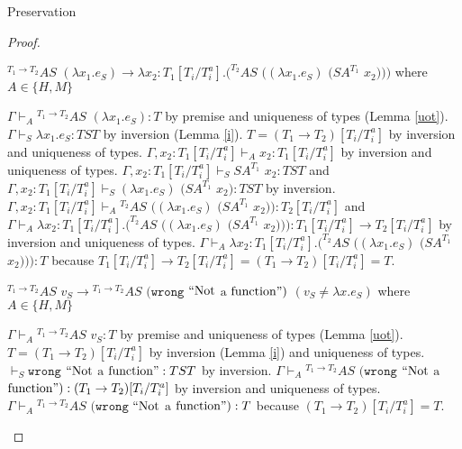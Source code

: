 \begin{theorem}{Preservation}
\begin{proof}

\begin{case}
$^{T_{1}\rightarrow T_{2}}AS$ $(\lambda x_{1}.e_{S})\rightarrow\lambda x_{2}:T_{1}[T_{i}/T_{i}^{a}].(^{T_{2}}AS$ $((\lambda x_{1}.e_{S})$ $(SA^{T_{1}}$ $x_{2})))$ where $A\in\lbrace H,M\rbrace$

$\Gamma\vdash_{A}{^{T_{1}\rightarrow T_{2}}A}S$ $(\lambda x_{1}.e_{S}):T$ by premise and uniqueness of types (Lemma \ref{uot}).  $\Gamma\vdash_{S}\lambda x_{1}.e_{S}:TST$ by inversion (Lemma \ref{i}).  $T=(T_{1}\rightarrow T_{2})[T_{i}/T_{i}^{a}]$ by inversion and uniqueness of types.  $\Gamma,x_{2}:T_{1}[T_{i}/T_{i}^{a}]\vdash_{A}x_{2}:T_{1}[T_{i}/T_{i}^{a}]$ by inversion and uniqueness of types.  $\Gamma,x_{2}:T_{1}[T_{i}/T_{i}^{a}]\vdash_{S}SA^{T_{1}}$ $x_{2}:TST$ and $\Gamma,x_{2}:T_{1}[T_{i}/T_{i}^{a}]\vdash_{S}(\lambda x_{1}.e_{S})$ $(SA^{T_{1}}$ $x_{2}):TST$ by inversion.  $\Gamma,x_{2}:T_{1}[T_{i}/T_{i}^{a}]\vdash_{A}{^{T_{2}}A}S$ $((\lambda x_{1}.e_{S})$ $(SA^{T_{1}}$ $x_{2})):T_{2}[T_{i}/T_{i}^{a}]$ and $\Gamma\vdash_{A}\lambda x_{2}:T_{1}[T_{i}/T_{i}^{a}].(^{T_{2}}AS$ $((\lambda x_{1}.e_{S})$ $(SA^{T_{1}}$ $x_{2}))):T_{1}[T_{i}/T_{i}^{a}]\rightarrow T_{2}[T_{i}/T_{i}^{a}]$ by inversion and uniqueness of types.  $\Gamma\vdash_{A}\lambda x_{2}:T_{1}[T_{i}/T_{i}^{a}].(^{T_{2}}AS$ $((\lambda x_{1}.e_{S})$ $(SA^{T_{1}}$ $x_{2}))):T$ because $T_{1}[T_{i}/T_{i}^{a}]\rightarrow T_{2}[T_{i}/T_{i}^{a}]=(T_{1}\rightarrow T_{2})[T_{i}/T_{i}^{a}]=T$.
\end{case}


\begin{case}
$^{T_{1}\rightarrow T_{2}}AS$ $v_{S}\rightarrow{^{T_{1}\rightarrow T_{2}}A}S$ $(\mathtt{wrong}$ $\mathrm{``Not}$ $\mathrm{a}$ $\mathrm{function"})$ $(v_{S}\neq\lambda x.e_{S})$ where $A\in\lbrace H,M\rbrace$

$\Gamma\vdash_{A}{^{T_{1}\rightarrow T_{2}}A}S$ $v_{S}:T$ by premise and uniqueness of types (Lemma \ref{uot}).  $T=(T_{1}\rightarrow T_{2})[T_{i}/T_{i}^{a}]$ by inversion (Lemma \ref{i}) and uniqueness of types.  $\vdash_{S}\mathtt{wrong}$ $\mathrm{``Not}$ $\mathrm{a}$ $\mathrm{function"}:TST$ by inversion.  $\Gamma\vdash_{A}{^{T_{1}\rightarrow T_{2}}A}S$ $(\mathtt{wrong}$ $\mathrm{``Not}$ $\mathrm{a}$ $\mathrm{function"}):(T_{1}\rightarrow T_{2})[T_{i}/T_{i}^{a}]$ by inversion and uniqueness of types.  $\Gamma\vdash_{A}{^{T_{1}\rightarrow T_{2}}A}S$ $(\mathtt{wrong}$ $\mathrm{``Not}$ $\mathrm{a}$ $\mathrm{function"}):T$ because $(T_{1}\rightarrow T_{2})[T_{i}/T_{i}^{a}]=T$.
\end{case}


\end{proof}
\end{theorem}
